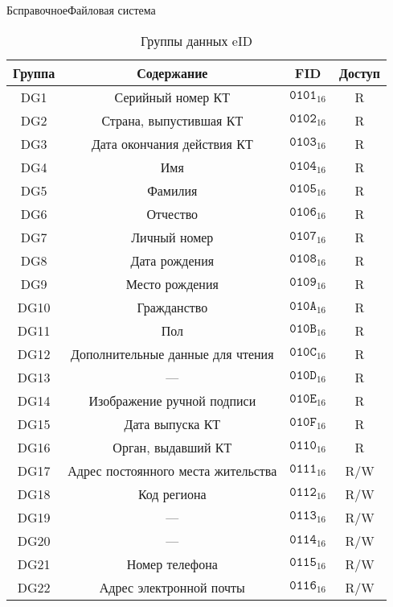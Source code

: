 \begin{appendix}{Б}{справочное}{Файловая система}
\begin{table}[H]
\caption{Группы данных eID}
\label{Table.FILES.DG}
\begin{tabular}{|c|c|c|c|}
\hline
Группа & Содержание & FID & Доступ\\
\hline
\hline
DG1 & Серийный номер КТ & 
$\texttt{0101}_{16}$ & R\\
DG2 & Страна, выпустившая КТ & 
$\texttt{0102}_{16}$ & R\\
DG3 & Дата окончания действия КТ & 
$\texttt{0103}_{16}$ & R\\
DG4 & Имя & 
$\texttt{0104}_{16}$ & R\\
DG5 & Фамилия & 
$\texttt{0105}_{16}$ & R\\
DG6 & Отчество & 
$\texttt{0106}_{16}$ & R\\
DG7 & Личный номер & 
$\texttt{0107}_{16}$ & R\\
DG8 & Дата рождения & 
$\texttt{0108}_{16}$ & R\\
DG9 & Место рождения & 
$\texttt{0109}_{16}$ & R\\
DG10 & Гражданство & 
$\texttt{010A}_{16}$ & R\\
DG11 & Пол & 
$\texttt{010B}_{16}$ & R\\
DG12 & Дополнительные данные для чтения & 
$\texttt{010C}_{16}$ & R\\
DG13 & 
--- &
$\texttt{010D}_{16}$ & R\\
DG14 & Изображение ручной подписи & 
$\texttt{010E}_{16}$ & R\\
DG15 & Дата выпуска КТ & 
$\texttt{010F}_{16}$ & R\\
DG16 & Орган, выдавший КТ &  
$\texttt{0110}_{16}$ & R\\
DG17 & 	Адрес постоянного места жительства & 
$\texttt{0111}_{16}$ & R/W\\
DG18 & 	Код региона & 
$\texttt{0112}_{16}$ & R/W\\
DG19 & 	
--- &
$\texttt{0113}_{16}$ & R/W\\
DG20 & 	
--- &
$\texttt{0114}_{16}$ & R/W\\
DG21 & 	Номер телефона & 
$\texttt{0115}_{16}$ & R/W\\
DG22 & 	Адрес электронной почты & 
$\texttt{0116}_{16}$ & R/W\\
\hline
\end{tabular}
\end{table}



\end{appendix}

